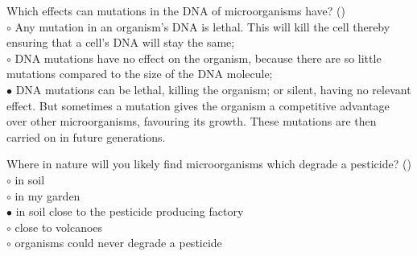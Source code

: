 \documentclass[]{beamer}
\begin{document}
\begin{frame}[shrink] {}
\addtocounter{questions}{1}
\color{blue}
Which effects can mutations in the DNA of microorganisms have? ()\\
\color{black}
\setlength{\parindent}{-0.4cm}
{\color{red}$\circ$} Any mutation in an organism's DNA is lethal. This will kill the cell
thereby ensuring that a cell’s DNA will stay the same;\\
{\color{red}$\circ$} DNA mutations have no effect on the organism, because there are
so little mutations compared to the size of the DNA molecule;\\
{\color{red}$\bullet$} DNA mutations can be lethal, killing the organism; or silent, having
no relevant effect. But sometimes a mutation gives the organism a
competitive advantage over other microorganisms, favouring its
growth. These mutations are then carried on in future generations.
\end{frame}

\begin{frame}[shrink] {}
\addtocounter{questions}{1}
\color{blue}
Where in nature will you likely find microorganisms which degrade a
pesticide? ()\\
\color{black}
\setlength{\parindent}{-0.4cm}
{\color{red}$\circ$} in soil\\
{\color{red}$\circ$} in my garden\\
{\color{red}$\bullet$} in soil close to the pesticide producing factory\\
{\color{red}$\circ$} close to volcanoes\\
{\color{red}$\circ$} organisms could never degrade a pesticide 
\end{frame}
\end{document}
